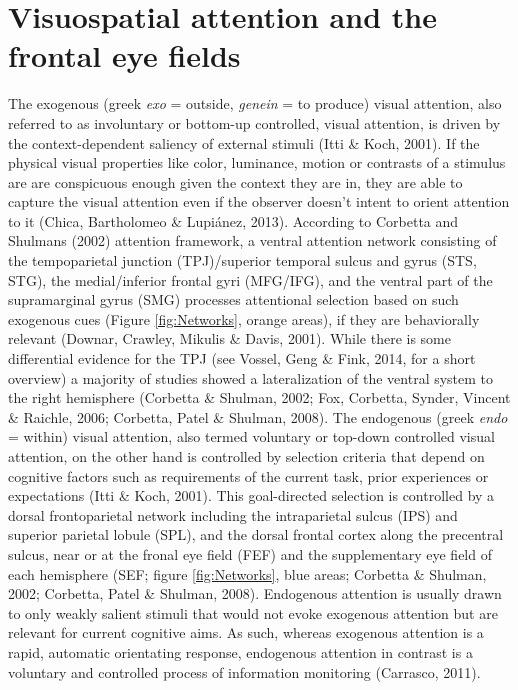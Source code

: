 \documentclass[a4paper, 12pt]{scrreprt}
\begin{document}
\section{Visuospatial attention and the frontal eye fields}\label{section:visualattention}
The exogenous (greek \textit{exo} = outside, \textit{genein} = to produce) visual attention, also referred to as involuntary or bottom-up controlled, visual attention, is driven by the context-dependent saliency of external stimuli (Itti \& Koch, 2001). If the physical visual properties like color, luminance, motion or contrasts of a stimulus are are conspicuous enough given the context they are in, they are able to capture the visual attention even if the observer doesn’t intent to orient attention to it (Chica, Bartholomeo \& Lupiánez, 2013). According to Corbetta and Shulmans (2002) attention framework, a ventral attention network consisting of the tempoparietal junction (TPJ)/superior temporal sulcus and gyrus (STS, STG), the medial/inferior frontal gyri (MFG/IFG), and the ventral part of the supramarginal gyrus (SMG) processes attentional selection based on such exogenous cues (Figure \ref{fig:Networks}, orange areas), if they are behaviorally relevant (Downar, Crawley, Mikulis \& Davis, 2001). While there is some differential evidence for the TPJ (see Vossel, Geng \& Fink, 2014, for a short overview) a majority of studies showed a lateralization of the ventral system to the right hemisphere (Corbetta \& Shulman, 2002; Fox, Corbetta, Synder, Vincent \& Raichle, 2006; Corbetta, Patel \& Shulman, 2008). \newline 
The endogenous (greek \textit{endo} = within) visual attention, also termed voluntary or top-down controlled visual attention, on the other hand is controlled by selection criteria that depend on cognitive factors such as requirements of the current task, prior experiences or expectations (Itti \& Koch, 2001). This goal-directed selection is controlled by a dorsal frontoparietal network including the intraparietal sulcus (IPS) and superior parietal lobule (SPL), and the dorsal frontal cortex along the precentral sulcus, near or at the fronal eye field (FEF) and the supplementary eye field of each hemisphere (SEF; figure \ref{fig:Networks}, blue areas; Corbetta \& Shulman, 2002; Corbetta, Patel \& Shulman, 2008). Endogenous attention is usually drawn to only weakly salient stimuli that would not evoke exogenous attention but are relevant for current cognitive aims. As such, whereas exogenous attention is a rapid, automatic orientating response, endogenous attention in contrast is a voluntary and controlled process of information monitoring (Carrasco, 2011).
\end{document}
